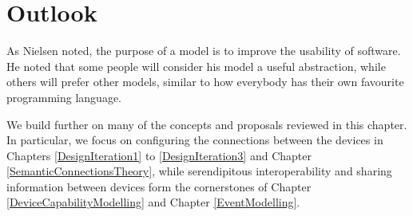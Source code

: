 
\section{Outlook}

As Nielsen \cite{Nielsen1986} noted, the purpose of a model is to improve the usability of software. He noted that some people will consider his model a useful abstraction, while others will prefer other models, similar to how everybody has their own favourite programming language.

We build further on many of the concepts and proposals reviewed in this chapter. In particular, we focus on configuring the connections between the devices in Chapters \ref{DesignIteration1} to \ref{DesignIteration3} and Chapter \ref{SemanticConnectionsTheory}, while serendipitous interoperability and sharing information between devices form the cornerstones of Chapter \ref{DeviceCapabilityModelling} and Chapter \ref{EventModelling}. 

